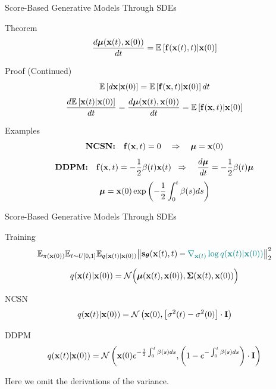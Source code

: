 \documentclass{beamer}
\begin{document}
\begin{frame}{Score-Based Generative Models Through SDEs}
	\begin{block}{Theorem}
		\vspace{-0.3cm}
		\[
			\frac{d \boldsymbol{\mu}(\mathbf{x}(t), \mathbf{x}(0))}{dt} = \mathbb{E} \left[ \mathbf{f}(\mathbf{x}(t), t) | \mathbf{x}(0)\right]
		\]
		\vspace{-0.5cm}
	\end{block}
	\begin{block}{Proof (Continued)}
		\vspace{-0.3cm}
		\[
			\mathbb{E}\left[d\mathbf{x} | \mathbf{x}(0) \right] = \mathbb{E}\left[\mathbf{f}(\mathbf{x}, t) | \mathbf{x}(0) \right] dt
		\]
		\[
			\frac{d \mathbb{E}\left[\mathbf{x}(t) | \mathbf{x}(0) \right]}{dt} = \frac{d \boldsymbol{\mu}(\mathbf{x}(t), \mathbf{x}(0))}{dt} = \mathbb{E}\left[\mathbf{f}(\mathbf{x}, t) | \mathbf{x}(0) \right] 
		\]
	\end{block}
	\vspace{-0.3cm}
	\begin{block}{Examples}
		\vspace{-0.5cm}
		\[
			\textbf{NCSN:}\quad	\mathbf{f}(\mathbf{x}, t) = 0 \quad \Rightarrow \quad \boldsymbol{\mu} = \mathbf{x}(0)
		\]
		\[
			\textbf{DDPM:}\quad \mathbf{f}(\mathbf{x}, t) = - \frac{1}{2} \beta(t) \mathbf{x}(t)\;\;   \Rightarrow\quad \frac{d \boldsymbol{\mu}}{dt} = - \frac{1}{2} \beta(t) \boldsymbol{\mu}
		\]
		\[
			\boldsymbol{\mu} = \mathbf{x}(0) \exp\left(- \frac{1}{2} \int_0^t \beta(s)ds\right)
		\]
	\end{block}
\end{frame}
\begin{frame}{Score-Based Generative Models Through SDEs}
	\begin{block}{Training}
		\vspace{-0.5cm}
		\[
			\mathbb{E}_{\pi(\mathbf{x}(0))} \mathbb{E}_{t \sim U[0, 1]} \mathbb{E}_{q(\mathbf{x}(t) | \mathbf{x}(0))}\bigl\| \mathbf{s}_{\boldsymbol{\theta}}(\mathbf{x}(t), t) - {\color{teal}\nabla_{\mathbf{x}(t)} \log q(\mathbf{x}(t) | \mathbf{x}(0))} \bigr\|^2_2 
		\]
		\vspace{-0.7cm}
	\end{block}
	\[
		q(\mathbf{x}(t) | \mathbf{x}(0)) = \mathcal{N}\Bigl(\boldsymbol{\mu}(\mathbf{x}(t), \mathbf{x}(0)), \boldsymbol{\Sigma}(\mathbf{x}(t), \mathbf{x}(0))\Bigr)
	\]
	\vspace{-0.5cm}
	\begin{block}{NCSN}
		\vspace{-0.3cm}
		\[
			q(\mathbf{x}(t) | \mathbf{x}(0)) = \mathcal{N}\left(\mathbf{x}(0), \left[\sigma^2(t) - \sigma^2(0)\right] \cdot \mathbf{I}\right)
		\]
		\vspace{-0.5cm}
	\end{block}
	\begin{block}{DDPM}
		\vspace{-0.3cm}
		\[
			q(\mathbf{x}(t) | \mathbf{x}(0)) = \mathcal{N}\left(\mathbf{x}(0) e^{-\frac{1}{2} \int_0^t\beta(s)ds}, \left(1 - e^{- \int_0^t\beta(s)ds}\right) \cdot \mathbf{I}\right)
		\]
		\vspace{-0.5cm}
	\end{block}
	Here we omit the derivations of the variance.
	
\end{frame}
\end{document}
